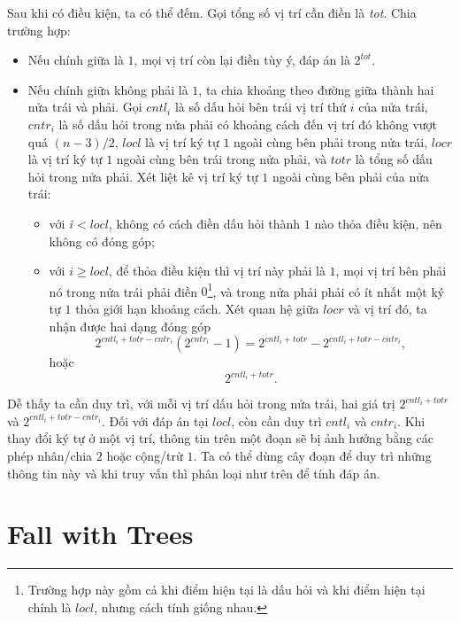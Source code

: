 \documentclass[11pt]{article}
\begin{document}
Sau khi có điều kiện, ta có thể đếm. Gọi tổng số vị trí cần điền là
\textit{tot}. Chia trường hợp:
\begin{itemize}
  \item Nếu chính giữa là $1$, mọi vị trí còn lại điền tùy ý, đáp án là
  $2^{\textit{tot}}$.
  \item Nếu chính giữa không phải là $1$, ta chia khoảng theo đường giữa thành
  hai nửa trái và phải. Gọi $\textit{cntl}_i$ là số dấu hỏi bên trái vị trí
  thứ $i$ của nửa trái, $\textit{cntr}_i$ là số dấu hỏi trong nửa phải có
  khoảng cách đến vị trí đó không vượt quá $(n-3)/2$, $\textit{locl}$ là vị trí
  ký tự $1$ ngoài cùng bên phải trong nửa trái, $\textit{locr}$ là vị trí ký tự
  $1$ ngoài cùng bên trái trong nửa phải, và $\textit{totr}$ là tổng số dấu hỏi
  trong nửa phải. Xét liệt kê vị trí ký tự $1$ ngoài cùng bên phải của nửa trái:
  \begin{itemize}
    \item với $i<\textit{locl}$, không có cách điền dấu hỏi thành $1$ nào thỏa
    điều kiện, nên không có đóng góp;
    \item với $i\ge \textit{locl}$, để thỏa điều kiện thì vị trí này phải là
    $1$, mọi vị trí bên phải nó trong nửa trái phải điền $0$\footnote{Trường
    hợp này gồm cả khi điểm hiện tại là dấu hỏi và khi điểm hiện tại chính là
    $\textit{locl}$, nhưng cách tính giống nhau.}, và trong nửa phải phải có ít
    nhất một ký tự $1$ thỏa giới hạn khoảng cách. Xét quan hệ giữa
    $\textit{locr}$ và vị trí đó, ta nhận được hai dạng đóng góp
    \[
      2^{\textit{cntl}_i+\textit{totr}-\textit{cntr}_i}
      \left(2^{\textit{cntr}_i}-1\right)
      =
      2^{\textit{cntl}_i+\textit{totr}}
      -
      2^{\textit{cntl}_i+\textit{totr}-\textit{cntr}_i},
    \]
    hoặc
    \[
      2^{\textit{cntl}_i+\textit{totr}}.
    \]
  \end{itemize}
\end{itemize}

Dễ thấy ta cần duy trì, với mỗi vị trí dấu hỏi trong nửa trái, hai giá trị
$2^{\textit{cntl}_i+\textit{totr}}$ và
$2^{\textit{cntl}_i+\textit{totr}-\textit{cntr}_i}$. Đối với đáp án tại
$\textit{locl}$, còn cần duy trì $\textit{cntl}_i$ và $\textit{cntr}_i$. Khi
thay đổi ký tự ở một vị trí, thông tin trên một đoạn sẽ bị ảnh hưởng bằng các
phép nhân/chia $2$ hoặc cộng/trừ $1$. Ta có thể dùng cây đoạn để duy trì những
thông tin này và khi truy vấn thì phân loại như trên để tính đáp án.

\section{Fall with Trees}
\end{document}
